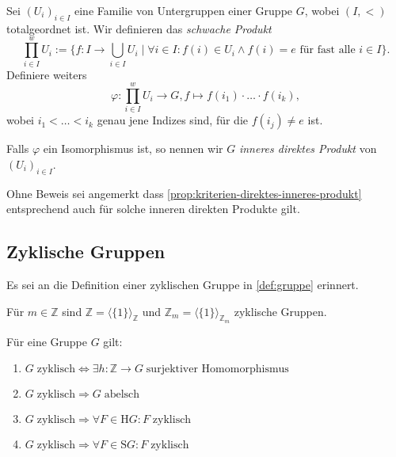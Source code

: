 \begin{remark}
    Sei $(U_i)_{i \in I}$ eine Familie von Untergruppen einer Gruppe $G$, wobei $(I, <)$ totalgeordnet ist. Wir definieren das \emph{schwache Produkt} 
    $$ \prod_{i \in I}^w U_i := \{ f : I \to \bigcup_{i \in I} U_i \mid \forall i \in I: f(i) \in U_i \land f(i) = e \textrm{ für fast alle } i \in I \}. $$
    Definiere weiters
    $$ \varphi : \prod_{i \in I}^w U_i \to G, f \mapsto f(i_1) \cdot \hdots \cdot f(i_k), $$
    wobei $i_1 < \hdots < i_k $ genau jene Indizes sind, für die $f(i_j) \neq e$ ist.

    Falls $\varphi$ ein Isomorphismus ist, so nennen wir $G$ \emph{inneres direktes Produkt} von $(U_i)_{i \in I}$.

    Ohne Beweis sei angemerkt dass \cref{prop:kriterien-direktes-inneres-produkt} entsprechend auch für solche inneren direkten Produkte gilt.
\end{remark}


\subsection{Zyklische Gruppen}

Es sei an die Definition einer zyklischen Gruppe in \cref{def:gruppe} erinnert.

\begin{example}
    Für $m\in\mathbb{Z}$ sind $\mathbb{Z} = \langle \{1\}\rangle_{\mathbb{Z}}$ und $\mathbb{Z}_m = \langle\{1\}\rangle_{\mathbb{Z}_m}$ zyklische Gruppen.
\end{example}

\begin{proposition}\label{prop:zyklische_gruppen_1} Für eine Gruppe $G$ gilt:
    \begin{enumerate}
        \item $G\;\text{zyklisch} \Leftrightarrow \exists h: \mathbb{Z} \to G\;\text{surjektiver Homomorphismus}$
        \item $G\;\text{zyklisch} \Rightarrow G\;\text{abelsch}$
        \item $G\;\text{zyklisch} \Rightarrow \forall F \in \mathrm{H}G: F\;\text{zyklisch}$
        \item $G\;\text{zyklisch} \Rightarrow \forall F \in \mathrm{S}G: F\;\text{zyklisch}$
    \end{enumerate}
\end{proposition}

